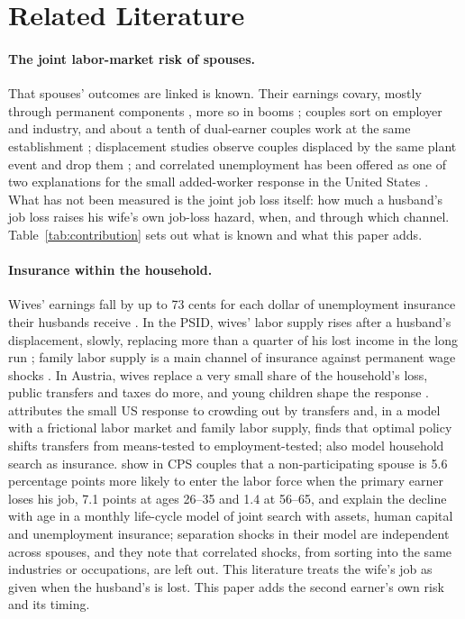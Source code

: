 \section{Related Literature}\label{sec:literature}

\paragraph{The joint labor-market risk of spouses.} That spouses' outcomes are linked is known. Their earnings covary,
mostly through permanent components \citep{hyslop2001rising}, more so in booms \citep{shore2010better}; couples sort on
employer and industry, and about a tenth of dual-earner couples work at the same establishment
\citep{hyatt2019coworking}; displacement studies observe couples displaced by the same plant event and drop them
\citep{halla2020job}; and correlated unemployment has been offered as one of two explanations for the small
added-worker response in the United States \citep{kawano2025who}. What has not been measured is the joint job loss
itself: how much a husband's job loss raises his wife's own job-loss hazard, when, and through which channel.
Table~\ref{tab:contribution} sets out what is known and what this paper adds.

\paragraph{Insurance within the household.} Wives' earnings fall by up to 73 cents for each dollar of unemployment
insurance their husbands receive \citep{cullen2000does}. In the PSID, wives' labor supply rises after a husband's
displacement, slowly, replacing more than a quarter of his lost income in the long run \citep{stephens2002worker};
family labor supply is a main channel of insurance against permanent wage shocks \citep{blundell2016consumption}. In
Austria, wives replace a very small share of the household's loss, public transfers and taxes do more, and young
children shape the response \citep{halla2020job}. \citet{birinci2019spousal} attributes the small US response to
crowding out by transfers and, in a model with a frictional labor market and family labor supply, finds that optimal
policy shifts transfers from means-tested to employment-tested; \citet{mankart2017household} also model household
search as insurance. \citet{bacher2025joint} show in CPS couples that a non-participating spouse is 5.6 percentage points more likely to
enter the labor force when the primary earner loses his job, 7.1 points at ages 26--35 and 1.4 at 56--65, and explain
the decline with age in a monthly life-cycle model of joint search with assets, human capital and unemployment
insurance; separation shocks in their model are independent across spouses, and they note that correlated shocks,
from sorting into the same industries or occupations, are left out. This literature treats the wife's job as given
when the husband's is lost. This paper adds the
second earner's own risk and its timing.

